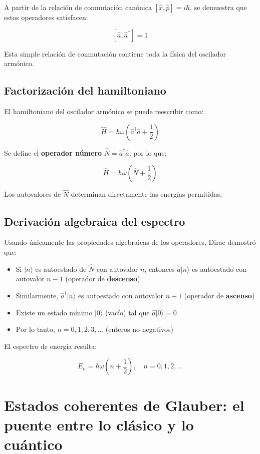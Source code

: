 \documentclass[11pt,a4paper,spanish]{book}
\begin{document}
A partir de la relación de conmutación canónica $[\hat{x}, \hat{p}] = i\hbar$, se demuestra que estos operadores satisfacen:

\[
[\hat{a}, \hat{a}^\dagger] = 1
\]

Esta simple relación de conmutación contiene toda la física del oscilador armónico.

\subsection*{Factorización del hamiltoniano}

El hamiltoniano del oscilador armónico se puede reescribir como:

\[
\hat{H} = \hbar\omega\left(\hat{a}^\dagger\hat{a} + \frac{1}{2}\right)
\]

Se define el \textbf{operador número} $\hat{N} = \hat{a}^\dagger\hat{a}$, por lo que:

\[
\hat{H} = \hbar\omega\left(\hat{N} + \frac{1}{2}\right)
\]

Los autovalores de $\hat{N}$ determinan directamente las energías permitidas.

\subsection*{Derivación algebraica del espectro}

Usando únicamente las propiedades algebraicas de los operadores, Dirac demostró que:

\begin{itemize}
	\item Si $|n\rangle$ es autoestado de $\hat{N}$ con autovalor $n$, entonces $\hat{a}|n\rangle$ es autoestado con autovalor $n-1$ (operador de \textbf{descenso})
	\item Similarmente, $\hat{a}^\dagger|n\rangle$ es autoestado con autovalor $n+1$ (operador de \textbf{ascenso})
	\item Existe un estado mínimo $|0\rangle$ (vacío) tal que $\hat{a}|0\rangle = 0$
	\item Por lo tanto, $n = 0, 1, 2, 3, \ldots$ (enteros no negativos)
\end{itemize}

El espectro de energía resulta:

\[
E_n = \hbar\omega\left(n + \frac{1}{2}\right), \quad n = 0, 1, 2, \ldots
\]

\section{Estados coherentes de Glauber: el puente entre lo clásico y lo cuántico} \label{sec:glauber}
\end{document}
